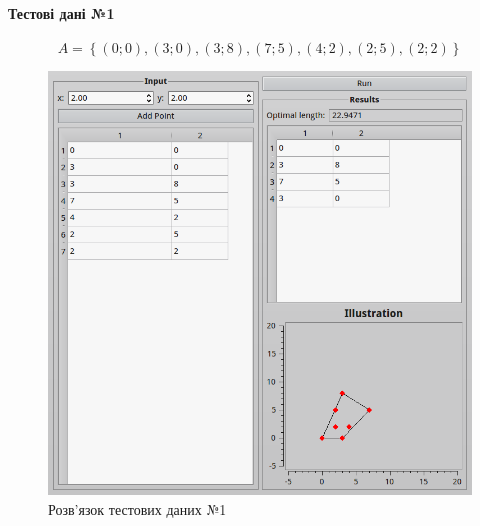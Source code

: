 \documentclass[utf8,ukrainian]{eskdtext}
\begin{document}
\paragraph{Тестові дані №1}
\begin{equation}
 A = \left\{ \left( 0; 0 \right), \left( 3; 0 \right), \left( 3; 8 \right),
  \left( 7; 5 \right), \left( 4; 2 \right), \left( 2; 5 \right), \left( 2; 2
\right) \right\}
  \label{eq:t1}
\end{equation}
\begin{figure}[h!]
  \centering
  \includegraphics[width=\textwidth]{scr1.png}
  \caption{Розв’язок тестових даних №1}
  \label{fig:f1}
\end{figure}
\end{document}
